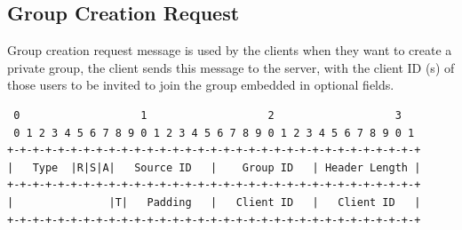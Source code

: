 \documentclass{article}
\begin{document}
\subsection{Group Creation Request}
Group creation request message is used by the clients when they want to create a private group, the client sends this message to the server, with the client ID (s) of those users to be invited to join the group embedded in optional fields. 
\begin{verbatim}  
 0                   1                   2                   3  
 0 1 2 3 4 5 6 7 8 9 0 1 2 3 4 5 6 7 8 9 0 1 2 3 4 5 6 7 8 9 0 1
+-+-+-+-+-+-+-+-+-+-+-+-+-+-+-+-+-+-+-+-+-+-+-+-+-+-+-+-+-+-+-+-+
|   Type  |R|S|A|   Source ID   |    Group ID   | Header Length |
+-+-+-+-+-+-+-+-+-+-+-+-+-+-+-+-+-+-+-+-+-+-+-+-+-+-+-+-+-+-+-+-+
|               |T|   Padding   |   Client ID   |   Client ID   |
+-+-+-+-+-+-+-+-+-+-+-+-+-+-+-+-+-+-+-+-+-+-+-+-+-+-+-+-+-+-+-+-+
\end{verbatim}
\end{document}
